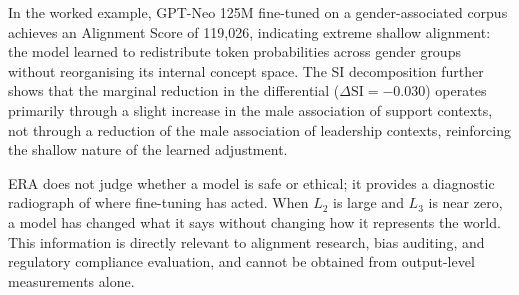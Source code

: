 \documentclass[11pt,a4paper]{article}
\begin{document}
In the worked example, GPT-Neo 125M fine-tuned on a gender-associated corpus achieves an
Alignment Score of 119,026, indicating extreme shallow alignment: the model learned to
redistribute token probabilities across gender groups without reorganising its internal
concept space. The SI decomposition further shows that the marginal reduction in the
differential ($\Delta\mathrm{SI} = -0.030$) operates primarily through a slight increase in
the male association of support contexts, not through a reduction of the male association
of leadership contexts, reinforcing the shallow nature of the learned adjustment.

ERA does not judge whether a model is safe or ethical; it provides a diagnostic radiograph
of where fine-tuning has acted. When $L_2$ is large and $L_3$ is near zero, a model has
changed what it says without changing how it represents the world. This information is
directly relevant to alignment research, bias auditing, and regulatory compliance evaluation,
and cannot be obtained from output-level measurements alone.
\end{document}
